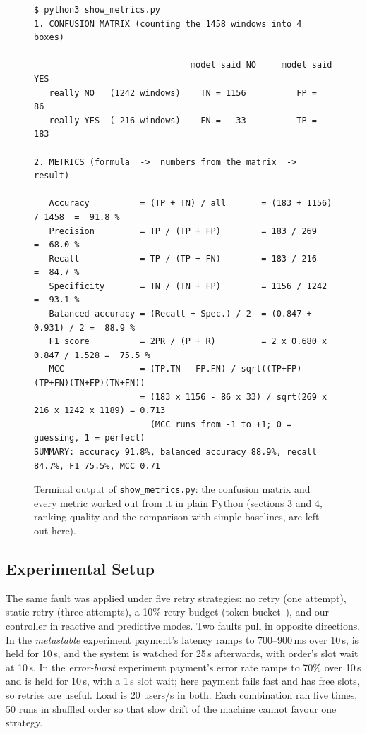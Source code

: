 \documentclass[conference,a4paper]{IEEEtran}
\begin{document}
\begin{figure}[!t]
\centering
\begin{minipage}{0.8\textwidth}
\begin{Verbatim}[fontsize=\scriptsize, frame=single, framesep=1.5mm]
$ python3 show_metrics.py
1. CONFUSION MATRIX (counting the 1458 windows into 4 boxes)

                               model said NO     model said YES
   really NO   (1242 windows)    TN = 1156          FP =   86
   really YES  ( 216 windows)    FN =   33          TP =  183

2. METRICS (formula  ->  numbers from the matrix  ->  result)

   Accuracy          = (TP + TN) / all       = (183 + 1156) / 1458  =  91.8 %
   Precision         = TP / (TP + FP)        = 183 / 269           =  68.0 %
   Recall            = TP / (TP + FN)        = 183 / 216           =  84.7 %
   Specificity       = TN / (TN + FP)        = 1156 / 1242         =  93.1 %
   Balanced accuracy = (Recall + Spec.) / 2  = (0.847 + 0.931) / 2 =  88.9 %
   F1 score          = 2PR / (P + R)         = 2 x 0.680 x 0.847 / 1.528 =  75.5 %
   MCC               = (TP.TN - FP.FN) / sqrt((TP+FP)(TP+FN)(TN+FP)(TN+FN))
                     = (183 x 1156 - 86 x 33) / sqrt(269 x 216 x 1242 x 1189) = 0.713
                       (MCC runs from -1 to +1; 0 = guessing, 1 = perfect)
SUMMARY: accuracy 91.8%, balanced accuracy 88.9%, recall 84.7%, F1 75.5%, MCC 0.71
\end{Verbatim}
\end{minipage}
\caption{Terminal output of \texttt{show\_metrics.py}: the confusion matrix and every metric worked out from it in plain Python (sections 3 and 4, ranking quality and the comparison with simple baselines, are left out here).}
\label{fig:metricsout}
\end{figure}

\subsection{Experimental Setup}
The same fault was applied under five retry strategies: no retry (one attempt), static retry (three attempts), a 10\% retry budget (token bucket~\cite{brooker2019}), and our controller in reactive and predictive modes. Two faults pull in opposite directions. In the \emph{metastable} experiment payment's latency ramps to 700--900\,ms over 10\,s, is held for 10\,s, and the system is watched for 25\,s afterwards, with order's slot wait at 10\,s. In the \emph{error-burst} experiment payment's error rate ramps to 70\% over 10\,s and is held for 10\,s, with a 1\,s slot wait; here payment fails fast and has free slots, so retries are useful. Load is 20 users/s in both. Each combination ran five times, 50 runs in shuffled order so that slow drift of the machine cannot favour one strategy.
\end{document}
